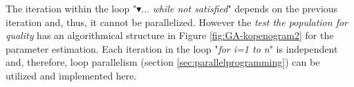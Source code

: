 The iteration within the loop "$\blacktriangledown \ldots$ \emph{while not satisfied}" depends on the previous iteration and, thus, it cannot be parallelized. However the \emph{test the population for quality} has an algorithmical structure in Figure \ref{fig:GA-kopenogram2} for the parameter estimation. Each iteration in the loop "\emph{for i=1 to n}" is independent and, therefore, loop parallelism (section \ref{sec:parallelprogramming}) can be utilized and implemented here.



